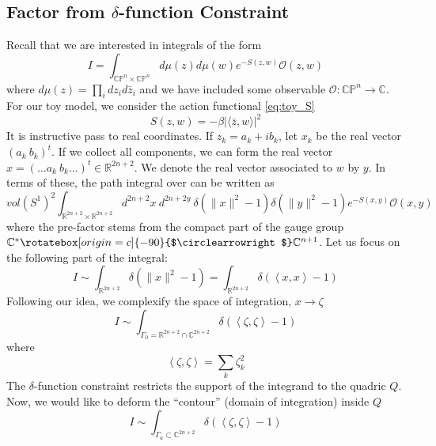 \documentclass[a4paper,11pt]{article}
\theoremstyle{definition}
\newcommand{\RR}{\mathbb{R}}
\newcommand{\CC}{\mathbb{C}}
\newcommand{\CP}{\mathbb{CP}}
\newcommand{\OO}{\mathcal O}
\newcommand{\acton}{\rotatebox[origin=c]{-90}{$\circlearrowright$}}
\begin{document}
\subsection{Factor from \texorpdfstring{$\delta$}{delta}-function Constraint}
Recall that we are interested in integrals of the form 
\begin{equation}
  I = \int_{\CP^n \times \CP^n} d\mu(z) d\mu(w) e^{-S(z,w)} \OO(z,w)
\end{equation}
where $d\mu(z) = \prod_i dz_i d\bar z_i$ and we have included some observable $\OO \colon \CP^n \to \CC$.
For our toy model, we consider the action functional \eqref{eq:toy_S}
\begin{equation}
  S(z,w) = -\beta \lvert \langle \bar z, w\rangle \rvert^2   
\end{equation}
It is instructive pass to real coordinates.
If $z_k = a_k + i b_k$, let $x_k$ be the real vector $(a_k\ b_k)^t$.
If we collect all components, we can form the real vector $x = ( \dots a_k\ b_k \dots)^t \in \RR^{2n +2}$.
We denote the real vector associated to $w$ by $y$.
In terms of these, the path integral over can be written as 
\begin{equation}
vol(S^1)^2\int_{\RR^{2n + 2} \times \RR^{2n + 2}} d^{2n + 2}x\ d^{2n + 2y}\ \delta(\lVert x \rVert^2 - 1)\delta(\lVert y \rVert ^2 -1) e^{- S(x,y)}\OO(x,y)
\end{equation}
where the pre-factor stems from the compact part of the gauge group $\CC^* \acton \CC^{n+1}$.
Let us focus on the following part of the integral:
\begin{equation}
  I \sim \int_{\RR^{2n + 2}} \delta(\lVert x \rVert^2 - 1) = \int_{\RR^{2n + 2}} \delta(\left\langle x, x \right\rangle  - 1) 
\end{equation}
Following our idea, we complexify the space of integration, $x \to \zeta$
\begin{equation}
  I \sim \int_{\Gamma_0 = \RR^{2n + 2} \cap \CC^{2n + 2}} \delta(\left\langle \zeta, \zeta \right\rangle  - 1)
\end{equation}
where 
\begin{equation}
  \left\langle \zeta, \zeta \right\rangle = \sum_k \zeta_k^2
\end{equation}
The $\delta$-function constraint restricts the support of the integrand to the quadric $Q$.
Now, we would like to deform the ``contour'' (domain of integration) inside $Q$
\begin{equation}
   I \sim \int_{\Gamma_a \subset \CC^{2n + 2}} \delta(\left\langle \zeta, \zeta \right\rangle  - 1)
\end{equation}
\end{document}
